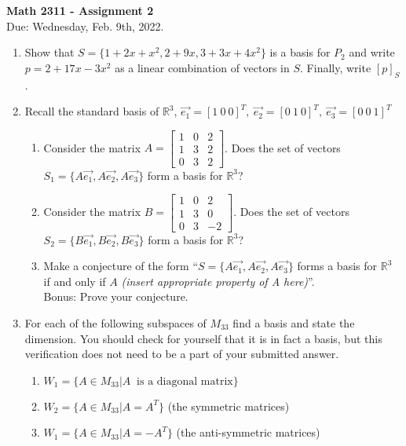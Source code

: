\documentclass[12pt]{article}
\newcommand {\DS} [1] {${\displaystyle #1}$}
\begin{document}
\thispagestyle{empty}

\begin{center}
\textbf{Math 2311  - Assignment 2}\\
Due: Wednesday, Feb. 9th, 2022.
\end{center}


\begin{enumerate}

\item
Show that \DS{S = \{ 1+2x+x^2, 2 + 9x, 3 + 3x + 4x^2 \} } is a basis for $P_2$ and write \\ 
$p = 2 + 17x - 3x^2$ as a linear combination of vectors in $S$. Finally, write $[p]_S$.

\item
Recall the standard basis of  $\mathbb{R}^3$, \DS{ \vec{e_1} = [1 \ 0 \ 0]^T, \ \vec{e_2} = [0 \ 1 \ 0]^T, \ \vec{e_3} = [0 \ 0 \ 1]^T}
\begin{enumerate}
\item Consider the matrix \DS{ A = \left[\begin{array}{ccc}
1 & 0 & 2 \\
1 & 3 & 2 \\
0 & 3 & 2
\end{array}\right]}. Does the set of vectors \DS{S_1 = \{ A\vec{e_1},A\vec{e_2},A\vec{e_3} \}} form a basis for $\mathbb{R}^3$?


\item Consider the matrix \DS{ B = \begin{bmatrix}
1 & 0 & 2 \\
1 & 3 & 0 \\
0 & 3 & -2
\end{bmatrix}}. Does the set of vectors \DS{S_2 = \{ B\vec{e_1},B\vec{e_2},B\vec{e_3} \}} form a basis for $\mathbb{R}^3$?

\item Make a conjecture of the form ``\DS{S = \{ A\vec{e_1},A\vec{e_2},A\vec{e_3} \}} forms a basis for $\mathbb{R}^3$ if and only if $A$ \emph{(insert appropriate property of A here)}''. \\
Bonus: Prove your conjecture.
 
\end{enumerate}

\item For each of the following subspaces of $M_{33}$ find a basis and state the dimension. You should check for yourself that it is in fact a basis, but this verification does not need to be a part of your submitted answer.
\begin{enumerate}
\item \DS{W_1 = \{A \in M_{33} | A \ \textrm{ is a diagonal matrix} \} }
\item \DS{W_2 = \{A \in M_{33} | A = A^T \} } (the symmetric matrices)
\item \DS{W_1 = \{A \in M_{33} | A = -A^T \} } (the anti-symmetric matrices)
\end{enumerate}


\end{enumerate}
\end{document}
